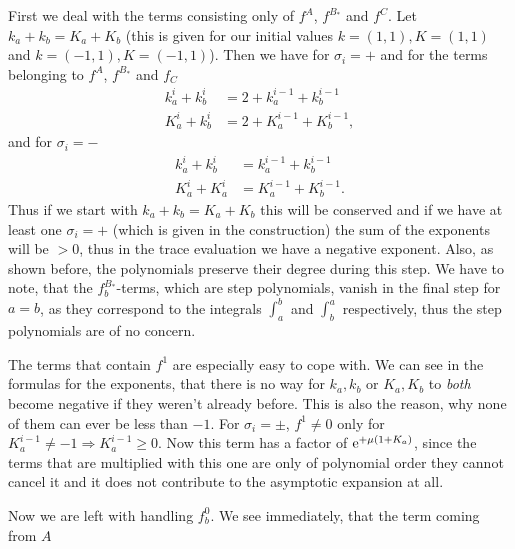 \begin{MainTheorem}
\begin{Proof}
    First we deal with the terms consisting only of $f^A$, $f^{B_*}$ and $f^C$.
    Let $k_a + k_b = K_a + K_b$ (this is given for our initial values $k =
    (1,1), K = (1,1)$ and $k = (-1,1), K=(-1,1)$). Then we have for $\sigma_i =
    +$ and for the terms belonging to $f^A$, $f^{B_*}$ and $f_C$
    \begin{align*}
      k^i_a + k^i_b &= 2 + k^{i-1}_a + k^{i-1}_b \\
      K^i_a + k^i_b &= 2 + K^{i-1}_a + K^{i-1}_b,
    \end{align*}
    and for $\sigma_i = -$
    \begin{align*}
      k^i_a + k^i_b &= k^{i-1}_a + k^{i-1}_b \\
      K^i_a + K^i_a &= K^{i-1}_a + K^{i-1}_b.
    \end{align*}
    Thus if we start with $k_a + k_b = K_a + K_b$ this will be conserved and if
    we have at least one $\sigma_i = +$ (which is given in the construction) the
    sum of the exponents will be $> 0$, thus in the trace evaluation we have a
    negative exponent. Also, as shown before, the polynomials preserve their
    degree during this step. We have to note, that the $f^{B_*}_b$-terms,
    which are step polynomials, vanish in the final step for $a = b$, as they
    correspond to the integrals $\int_a^b$ and $\int_b^a$ respectively, thus
    the step polynomials are of no concern.

    The terms that contain $f^1$ are especially easy to cope with. We can see in
    the formulas for the exponents, that there is no way for $k_a, k_b$ or $K_a,
    K_b$ to \emph{both} become negative if they weren't already before. This is
    also the reason, why none of them can ever be less than $-1$.
    For $\sigma_i = \pm$, $f^1 \neq 0$ only for $K^{i-1}_a \neq -1 \Rightarrow
    K^{i-1}_a \geq 0$. Now this term has a factor of $\mathrm e^{+\mu (1+K_a)}$, since
    the terms that are multiplied with this one are only of polynomial order
    they cannot cancel it and it does not contribute to the asymptotic expansion
    at all.

    Now we are left with handling $f^0_b$. We see immediately, that the term
    coming from $A$


\end{Proof}
\end{MainTheorem}
